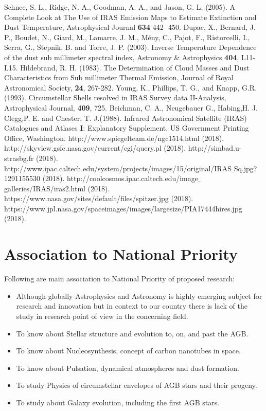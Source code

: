 \documentclass[fleqn,a4paper,12pt,oneside]{article}
\begin{document}
\begin{thebibliography}{}
	 Schnee, S. L.,  Ridge, N. A.,  Goodman, A. A., and Jason, G. L. (2005). A Complete Look at The Use of IRAS
	Emission Maps to Estimate Extinction and Dust Temperature, Astrophysical Journal \textbf{634}  442- 450.
	  Dupac, X.,  Bernard, J. P., Boudet, N., Giard, M.,   Lamarre, J. M.,    Mény, C.,  Pajot, F.,  Ristorcelli, I.,  Serra, G.,  Stepnik, B.  and Torre, J. P. (2003). Inverse Temperature Dependence of the dust sub millimeter spectral index,
	Astronomy \& Astrophysics \textbf{404}, L11-L15.
	 Hildebrand, R. H. (1983). The Determination of Cloud Masses and Dust Characteristics from Sub millimeter
	Thermal Emission, Journal of Royal Astronomical Society, \textbf{ 24}, 267-282.
	 Young, K.,  Phillips, T. G., and  Knapp, G.R. (1993). Circumstellar Shells resolved in IRAS Survey data II-Analysis,
	Astrophysical Journal, \textbf{409}, 725.
	 Beichman,  C. A., Neugebauer G.,  Habing,H. J.  Clegg,P. E. and  Chester, T. J.(1988). Infrared Astronomical Satellite (IRAS) Catalogues and
	Atlases \textbf{ I}: Explanatory Supplement. US Government
	Printing Office, Washington.
		http://www.spiegelteam.de/ngc1514.html (2018).
	http://skyview.gsfc.nasa.gov/current/cgi/query.pl (2018).
	 http://simbad.u-strasbg.fr (2018).
	 http://www.ipac.caltech.edu/system/projects/images/15/original/IRAS$\_$Sq.jpg?1291155530 (2018).
	http://coolcosmos.ipac.caltech.edu/image$\_$galleries/IRAS/iras2.html (2018).
	 https://www.nasa.gov/sites/default/files/spitzer.jpg (2018).
	https://www.jpl.nasa.gov/spaceimages/images/largesize/PIA17444hires.jpg (2018).
		
\end{thebibliography}

\section{Association to National Priority}

Following are main association to National Priority of proposed research:
\begin{itemize}
	\item	Although  globally Astrophysics and Astronomy is highly emerging subject for research and innovation  but in context to our country there is lack of the study in research point of view  in the concerning field. 
	\item To know about	Stellar structure and evolution to, on, and past the AGB. 
	\item	To know about Nucleosynthesis, concept of carbon nanotubes in space.  
	
	\item	To know about Pulsation, dynamical atmospheres and dust formation.  
	\item To study Physics of circumstellar envelopes of AGB stars and their progeny.  
	\item To study about Galaxy evolution, including the first AGB stars. 
\end{itemize} 
\end{document}
